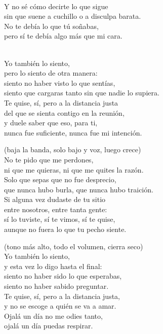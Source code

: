 \begin{lyrics}
\\
Y no sé cómo decirte lo que sigue\\
sin que suene a cuchillo o a disculpa barata.\\
No te debía lo que tú soñabas,\\
pero sí te debía algo más que mi cara.

\\
Yo también lo siento,\\
pero lo siento de otra manera:\\
siento no haber visto lo que sentías,\\
siento que cargaras tanto sin que nadie lo supiera.\\
Te quise, sí, pero a la distancia justa\\
del que se sienta contigo en la reunión,\\
y duele saber que eso, para ti,\\
nunca fue suficiente, nunca fue mi intención.

 (baja la banda, solo bajo y voz, luego crece)\\
No te pido que me perdones,\\
ni que me quieras, ni que me quites la razón.\\
Solo que sepas que no fue desprecio,\\
que nunca hubo burla, que nunca hubo traición.\\
Si alguna vez dudaste de tu sitio\\
entre nosotros, entre tanta gente:\\
sí lo tuviste, sí te vimos, sí te quise,\\
aunque no fuera lo que tu pecho siente.

 (tono más alto, todo el volumen, cierra seco)\\
Yo también lo siento,\\
y esta vez lo digo hasta el final:\\
siento no haber sido lo que esperabas,\\
siento no haber sabido preguntar.\\
Te quise, sí, pero a la distancia justa,\\
y no se escoge a quién se va a amar.\\
Ojalá un día no me odies tanto,\\
ojalá un día puedas respirar.
\end{lyrics}

